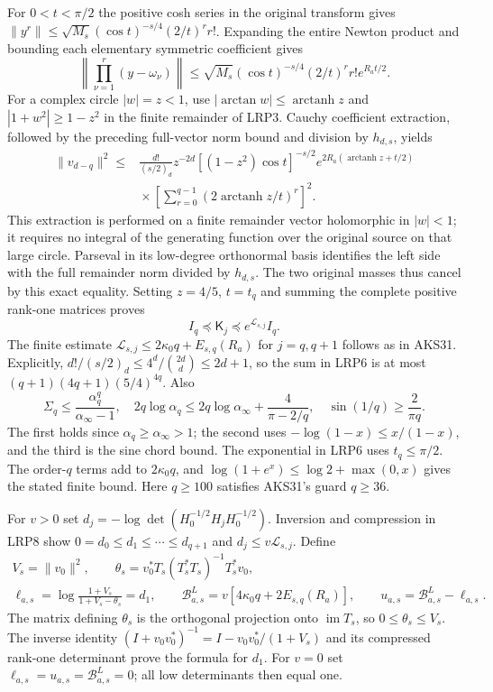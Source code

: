\documentclass[11pt,a4paper]{article}
\begin{document}
For $0<t<\pi/2$ the positive cosh series in the original transform gives
$\|y^r\|\le\sqrt{M_s}(\cos t)^{-s/4}(2/t)^r r!$.
Expanding the entire Newton product and bounding each elementary
symmetric coefficient gives
\[
 \left\|\prod_{\nu=1}^{r}(y-\omega_\nu)\right\|
 \le\sqrt{M_s}(\cos t)^{-s/4}(2/t)^r r!e^{R_at/2}.
\]
For a complex circle $|w|=z<1$, use
$|\arctan w|\le\operatorname{arctanh}z$ and
$|1+w^2|\ge1-z^2$ in the finite remainder of LRP3.
Cauchy coefficient extraction, followed by the preceding full-vector
norm bound and division by $h_{d,s}$, yields
\[
\begin{split}
 \|v_{d-q}\|^2\le{}&\frac{d!}{(s/2)_d}z^{-2d}
 [(1-z^2)\cos t]^{-s/2}
 e^{2R_a(\operatorname{arctanh}z+t/2)}\\
 &\mathrel{}\times
 \left[\sum_{r=0}^{q-1}
       (2\operatorname{arctanh}z/t)^r\right]^2.
\end{split}\tag{LRP7}
\]
This extraction is performed on a finite remainder vector holomorphic
in $|w|<1$; it requires no integral of the generating function over
the original source on that large circle. Parseval in its low-degree
orthonormal basis identifies the left side with the full remainder
norm divided by $h_{d,s}$. The two original masses thus cancel by
this exact equality. Setting $z=4/5$, $t=t_q$ and summing the complete
positive rank-one matrices proves
\[
 I_q\preceq\mathsf K_j\preceq e^{\mathcal L_{s,j}}I_q.
 \tag{LRP8}
\]
The finite estimate $\mathcal L_{s,j}\le2\kappa_0q+E_{s,q}(R_a)$
for $j=q,q+1$ follows as in AKS31. Explicitly,
$d!/(s/2)_d\le4^d/\binom{2d}{d}\le2d+1$, so the sum in LRP6
is at most $(q+1)(4q+1)(5/4)^{4q}$. Also
\[
 \Sigma_q\le\frac{\alpha_q^q}{\alpha_\infty-1},\quad
 2q\log\alpha_q\le2q\log\alpha_\infty+\frac4{\pi-2/q},\quad
 \sin(1/q)\ge\frac2{\pi q}.
\]
The first holds since $\alpha_q\ge\alpha_\infty>1$; the second
uses $-\log(1-x)\le x/(1-x)$, and the third is the sine chord bound.
The exponential in LRP6 uses $t_q\le\pi/2$. The order-$q$ terms add
to $2\kappa_0q$, and $\log(1+e^x)\le\log2+\max(0,x)$ gives the
stated finite bound. Here $q\ge100$ satisfies AKS31's guard $q\ge36$.

For $v>0$ set $d_j=-\log\det(H_0^{-1/2}H_jH_0^{-1/2})$.
Inversion and compression in LRP8 show
$0=d_0\le d_1\le\cdots\le d_{q+1}$ and
$d_j\le v\mathcal L_{s,j}$. Define
\[
\begin{gathered}
 V_s=\|v_0\|^2,\qquad
 \theta_s=v_0^*T_s(T_s^*T_s)^{-1}T_s^*v_0,\\
 \ell_{a,s}=\log\frac{1+V_s}{1+V_s-\theta_s}=d_1,\qquad
 \mathcal B^{L}_{a,s}=v[4\kappa_0q+2E_{s,q}(R_a)],\qquad
 u_{a,s}=\mathcal B^{L}_{a,s}-\ell_{a,s}.
\end{gathered}\tag{LRP9}
\]
The matrix defining $\theta_s$ is the orthogonal projection onto
$\operatorname{im}T_s$, so $0\le\theta_s\le V_s$.
The inverse identity
$(I+v_0v_0^*)^{-1}=I-v_0v_0^*/(1+V_s)$ and its compressed
rank-one determinant prove the formula for $d_1$.
For $v=0$ set $\ell_{a,s}=u_{a,s}=\mathcal B^L_{a,s}=0$;
all low determinants then equal one.
\end{document}
